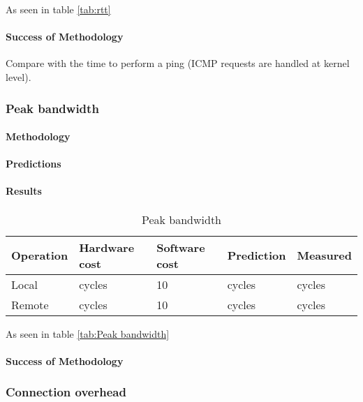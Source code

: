As seen in table \ref{tab:rtt}
\paragraph{Success of Methodology}

 Compare with the time to perform a ping (ICMP requests are handled at kernel level).






\subsubsection{Peak bandwidth}



\paragraph{Methodology}
\paragraph{Predictions}
\paragraph{Results}
\begin{table}[h]
\begin{center}
\begin{tabular}{| l | l | l | l | l |}
\hline
Operation & Hardware cost & Software cost & Prediction & Measured \\
\hline
Local 	&  cycles		& 10			&  cycles	&  cycles \\
\hline
Remote 	&  cycles		& 10			&  cycles	&  cycles \\
\hline

\end{tabular}
\end{center}
\caption{Peak bandwidth\label{tab:peak-bandwidth}}
\end{table}

As seen in table \ref{tab:Peak bandwidth}
\paragraph{Success of Methodology}





\subsubsection{Connection overhead}
